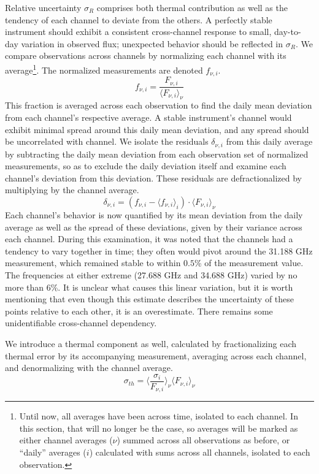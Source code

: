 \documentclass{article}
\begin{document}
	Relative uncertainty $\sigma_{R}$ comprises both thermal contribution as well as the tendency of each channel to deviate from the others.
	A perfectly stable instrument should exhibit a consistent cross-channel response to small, day-to-day variation in observed flux; unexpected behavior should be reflected in $\sigma_{R}$.
	We compare observations across channels by normalizing each channel with its average\footnote{Until now, all averages have been across time, isolated to each channel.
	In this section, that will no longer be the case, so averages will be marked as either channel averages ($\nu$) summed across all observations as before, or ``daily'' averages ($i$) calculated with sums across all channels, isolated to each observation.}.
	The normalized measurements are denoted $f_{\nu, i}$.
	$$ f_{\nu, i} = \frac{F_{\nu, i}}{\langle F_{\nu, i} \rangle_{\nu}} $$
	This fraction is averaged across each observation to find the daily mean deviation from each channel's respective average.
	A stable instrument's channel would exhibit minimal spread around this daily mean deviation, and any spread should be uncorrelated with channel.
	We isolate the residuals $\delta_{\nu, i}$ from this daily average by subtracting the daily mean deviation from each observation set of normalized measurements, so as to exclude the daily deviation itself and examine each channel's deviation from this deviation.
	These residuals are defractionalized by multiplying by the channel average.
	$$ \delta_{\nu, i} = (f_{\nu, i} - \langle f_{\nu, i} \rangle_{i}) \cdot \langle F_{\nu, i} \rangle_{\nu} $$
	Each channel's behavior is now quantified by its mean deviation from the daily average as well as the spread of these deviations, given by their variance across each channel.
	During this examination, it was noted that the channels had a tendency to vary together in time; they often would pivot around the 31.188 GHz measurement, which remained stable to within $0.5$\% of the measurement value.
	The frequencies at either extreme (27.688 GHz and 34.688 GHz) varied by no more than 6\%.
	It is unclear what causes this linear variation, but it is worth mentioning that even though this estimate describes the uncertainty of these points relative to each other, it is an overestimate.
	There remains some unidentifiable cross-channel dependency.

	We introduce a thermal component as well, calculated by fractionalizing each thermal error by its accompanying measurement, averaging across each channel, and denormalizing with the channel average.
	$$\sigma_{th} = \Bigg\langle \frac{\sigma_{i}}{F_{\nu,i}} \Bigg\rangle_{\nu} \langle F_{\nu, i} \rangle_{\nu} $$
\end{document}
